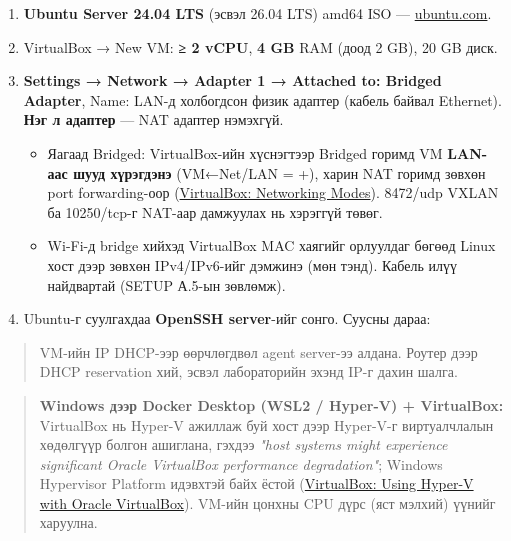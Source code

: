 \begin{enumerate}
\def\labelenumi{\arabic{enumi}.}
\tightlist
\item
  \textbf{Ubuntu Server 24.04 LTS} (эсвэл 26.04 LTS) amd64 ISO --- \href{https://ubuntu.com/about/release-cycle}{ubuntu.com}.
\item
  VirtualBox → New VM: \textbf{≥ 2 vCPU}, \textbf{4 GB} RAM (доод 2 GB), 20 GB диск.
\item
  \textbf{Settings → Network → Adapter 1 → Attached to: Bridged Adapter}, Name: LAN-д холбогдсон физик адаптер (кабель байвал Ethernet). \textbf{Нэг л адаптер} --- NAT адаптер нэмэхгүй.

  \begin{itemize}
  \tightlist
  \item
    Яагаад Bridged: VirtualBox-ийн хүснэгтээр Bridged горимд VM \textbf{LAN-аас шууд хүрэгдэнэ} (VM←Net/LAN = +), харин NAT горимд зөвхөн port forwarding-оор (\href{https://www.virtualbox.org/manual/topics/networkingdetails.html}{VirtualBox: Networking Modes}). 8472/udp VXLAN ба 10250/tcp-г NAT-аар дамжуулах нь хэрэггүй төвөг.
  \item
    Wi-Fi-д bridge хийхэд VirtualBox MAC хаягийг орлуулдаг бөгөөд Linux хост дээр зөвхөн IPv4/IPv6-ийг дэмжинэ (мөн тэнд). Кабель илүү найдвартай (SETUP А.5-ын зөвлөмж).
  \end{itemize}
\item
  Ubuntu-г суулгахдаа \textbf{OpenSSH server}-ийг сонго. Суусны дараа:
\end{enumerate}

\begin{Shaded}
\begin{Highlighting}[]
\end{Highlighting}
\end{Shaded}

\begin{quote}
VM-ийн IP DHCP-ээр өөрчлөгдвөл agent server-ээ алдана. Роутер дээр DHCP reservation хий, эсвэл лабораторийн эхэнд IP-г дахин шалга.
\end{quote}

\begin{quote}
\textbf{Windows дээр Docker Desktop (WSL2 / Hyper-V) + VirtualBox:} VirtualBox нь Hyper-V ажиллаж буй хост дээр Hyper-V-г виртуалчлалын хөдөлгүүр болгон ашиглана, гэхдээ \emph{"host systems might experience significant Oracle VirtualBox performance degradation"}; Windows Hypervisor Platform идэвхтэй байх ёстой (\href{https://www.virtualbox.org/manual/UserManual.html}{VirtualBox: Using Hyper-V with Oracle VirtualBox}). VM-ийн цонхны CPU дүрс (яст мэлхий) үүнийг харуулна.
\end{quote}

